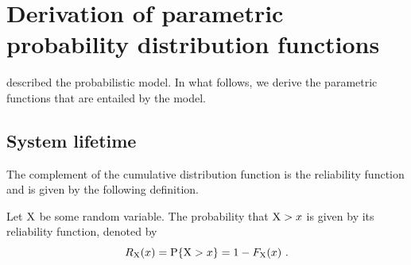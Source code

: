 \documentclass[../main.tex]{subfiles}
\begin{document}
\label{sec:distribution_functions}
\chapter{Derivation of parametric probability distribution functions}
 described the probabilistic model. In what follows, we derive the parametric functions that are entailed by the model.

\section{System lifetime}
The complement of the cumulative distribution function is the reliability 
function and is given by the following definition.
\begin{definition}
    \label{def:rel_function}
    Let $\mathrm{X}$ be some random variable. The probability that $\mathrm{X} > x$ is 
    given by its reliability function, denoted by
    \begin{equation}
    \label{eq:rel_function}
    R_{\mathrm{X}}\!\left(x\right) = \mathrm{P}\{\mathrm{X} > x\} = 1 - 
    F_{\mathrm{X}}\!\left(x\right)\,.
    \end{equation}
\end{definition}
\end{document}
